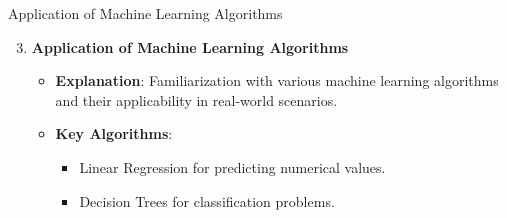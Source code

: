 \documentclass[aspectratio=169]{beamer}
\begin{document}
\begin{frame}[fragile]{Application of Machine Learning Algorithms}
    \begin{enumerate}
        \setcounter{enumi}{2}
        \item \textbf{Application of Machine Learning Algorithms}
            \begin{itemize}
                \item \textbf{Explanation}: Familiarization with various machine learning algorithms and their applicability in real-world scenarios.
                \item \textbf{Key Algorithms}: 
                \begin{itemize}
                    \item Linear Regression for predicting numerical values.
                    \item Decision Trees for classification problems.
                \end{itemize}
            \end{itemize}
    \end{enumerate}
\end{frame}
\end{document}
